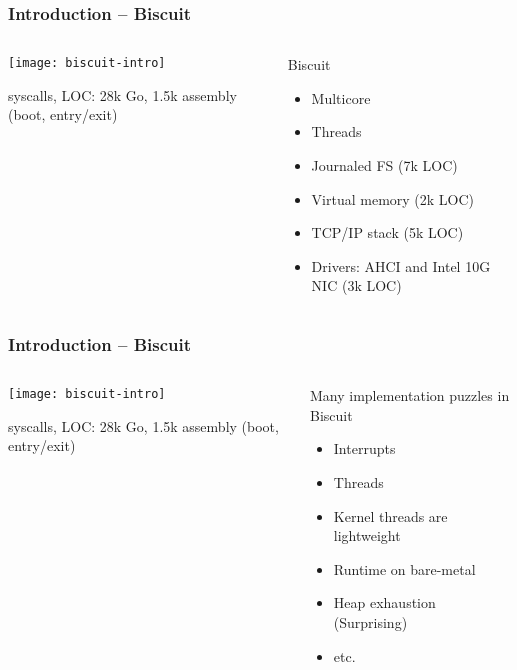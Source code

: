 \begin{frame}[plain]
	\frametitle{Introduction -- Biscuit}
	
	\begin{columns}
		
		\begin{column}{.4\textwidth}
			
			\texttt{[image: biscuit-intro]}
			
			 syscalls, LOC: 28k Go,
			1.5k assembly (boot, entry/exit)
			
		\end{column}
		
		\begin{column}{.6\textwidth}
			Biscuit
			\begin{itemize}
				\item Multicore
				
				\item Threads
				
				\item Journaled FS (7k LOC)
				
				\item Virtual memory (2k LOC)
				\item TCP/IP stack (5k LOC)

				\item Drivers: AHCI and Intel 10G NIC (3k LOC)
				
				
			\end{itemize}
		\end{column}
	\end{columns}	
\end{frame}


\begin{frame}[plain]
	\frametitle{Introduction -- Biscuit}
	
	\begin{columns}
		
		\begin{column}{.4\textwidth}
			
			\texttt{[image: biscuit-intro]}
			
			 syscalls, LOC: 28k Go,
			1.5k assembly (boot, entry/exit)
			
		\end{column}
		
		\begin{column}{.6\textwidth}
			Many implementation puzzles in Biscuit
			\begin{itemize}
				\item Interrupts
				\item Threads			
				\item Kernel threads are lightweight	
				\item Runtime on bare-metal
				\item Heap exhaustion (Surprising)
				\item etc.
			\end{itemize}
		\end{column}
	\end{columns}	
\end{frame}



